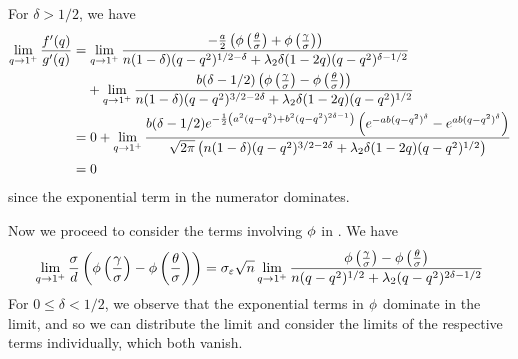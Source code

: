 For \(\delta > 1/2\), we have
\[
  \begin{aligned}
    \lim_{q \rightarrow 1^+} \frac{f'(q)}{g'(q)} & = \lim_{q \rightarrow 1^+} \frac{-\frac{a}{2}\left(\pdf\left(\frac{\theta}{\sigma}\right) + \pdf\left(\frac{\gamma}{\sigma}\right)\right)}{n(1-\delta)(q - q^2)^{1/2 - \delta} + \lambda_2 \delta(1 - 2q)(q - q^2)^{\delta - 1/2}}                                                       \\
                                                 & \phantom{= {}} + \lim_{q \rightarrow 1^+} \frac{b(\delta - 1/2)\left(\pdf\left(\frac{\gamma}{\sigma}\right) - \pdf\left(\frac{\theta}{\sigma}\right)\right)}{n(1 - \delta)(q - q^2)^{3/2 - 2\delta} + \lambda_2 \delta (1 - 2q)(q - q^2)^{1/2}}                                          \\
                                                 & = 0 + \lim_{q \rightarrow 1^+} \frac{b(\delta - 1/2) e^{-\frac{1}{2}\left(a^2(q - q^2) + b^2(q - q^2)^{2\delta - 1}\right)}\left(e^{-ab(q-q^2)^\delta} - e^{ab(q-q^2)^\delta}\right)}{\sqrt{2\pi}\left(n(1-\delta)(q - q^2)^{3/2 - 2\delta} + \lambda_2\delta(1-2q)(q-q^2)^{1/2}\right)} \\
                                                 & = 0
  \end{aligned}
\]
since the exponential term in the numerator dominates.

Now we proceed to consider the terms involving \(\operatorname{\phi}\) in . We have
\begin{equation}
  \label{eq:eval-qlimit-pdfterm}
  \lim_{q \rightarrow 1^+} \frac{\sigma}{d} \left(\operatorname{\phi} \left(\frac{\gamma}{\sigma}\right) - \operatorname{\phi} \left(\frac{\theta}{\sigma}\right)\right)
  = \sigma_\varepsilon \sqrt{n} \lim_{q \rightarrow 1^+} \frac{ \operatorname{\phi}\left(\frac{\gamma}{\sigma}\right) - \operatorname{\phi}\left(\frac{\theta}{\sigma}\right)}{n(q-q^2)^{1/2} + \lambda_2(q - q^2)^{2\delta - 1/2}}
\end{equation}
For \(0 \leq \delta < 1/2\), we observe that the exponential terms in \(\operatorname{\phi}\) dominate in the limit, and so we can distribute the limit and consider the limits of the respective terms individually, which both vanish.

